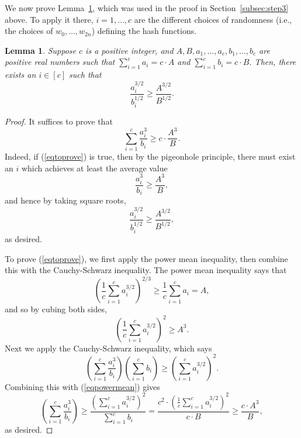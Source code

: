 \PassOptionsToPackage{shortlabels}{enumitem}\documentclass[10pt,a4paper]{article}
\newtheorem{lemma}{Lemma}[section]
\begin{document}
We now prove Lemma~\ref{lem:apppowermean}, which was used in the proof in Section~\ref{subsec:step3} above. To apply it there, $i = 1, \ldots, c$ are the different choices of randomness (i.e., the choices of $w_0, \ldots, w_{2n}$) defining the hash functions.

\begin{lemma} \label{lem:apppowermean}
Suppose $c$ is a positive integer, and $A,B,a_1, \ldots, a_c, b_1, \ldots, b_c$ are positive real numbers such that $\sum_{i=1}^c a_i = c \cdot A$ and $\sum_{i=1}^c b_i = c \cdot B$. Then, there exists an $i \in [c]$ such that $$\frac{a_i^{3/2}}{b_i^{1/2}} \geq \frac{A^{3/2}}{B^{1/2}}.$$
\end{lemma}

\begin{proof}
It suffices to prove that \begin{equation}\label{eqtoprove}\sum_{i=1}^c \frac{a_i^3}{b_i} \geq c \cdot \frac{A^3}{B}.\end{equation} Indeed, if (\ref{eqtoprove}) is true, then by the pigeonhole principle, there must exist an $i$ which achieves at least the average value $$\frac{a_i^3}{b_i} \geq \frac{A^3}{B},$$ and hence by taking square roots, $$\frac{a_i^{3/2}}{b_i^{1/2}} \geq \frac{A^{3/2}}{B^{1/2}},$$ as desired.

To prove (\ref{eqtoprove}), we first apply the power mean inequality, then combine this with the Cauchy-Schwarz inequality. The power mean inequality says that
$$\left( \frac{1}{c} \sum_{i=1}^c a_i^{3/2} \right)^{2/3} \geq \frac{1}{c} \sum_{i=1}^c a_i = A,$$
and so by cubing both sides,
\begin{equation}\label{eqpowermean} \left( \frac{1}{c} \sum_{i=1}^c a_i^{3/2} \right)^{2} \geq  A^3. \end{equation}
Next we apply the Cauchy-Schwarz inequality, which says
$$\left( \sum_{i=1}^c \frac{a_i^3}{b_i} \right) \left( \sum_{i=1}^c b_i \right) \geq \left( \sum_{i=1}^c a_i^{3/2} \right)^2.$$
Combining this with (\ref{eqpowermean}) gives
$$\left( \sum_{i=1}^c \frac{a_i^3}{b_i} \right)  \geq \frac{\left( \sum_{i=1}^c a_i^{3/2} \right)^2}{ \sum_{i=1}^c b_i } = \frac{c^2 \cdot \left( \frac{1}{c}\sum_{i=1}^c  a_i^{3/2} \right)^2}{c \cdot B} \geq \frac{c \cdot A^3}{B},$$ as desired.
\end{proof}
\end{document}
